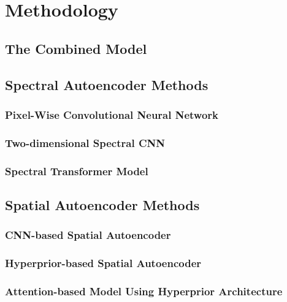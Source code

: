 \chapter{Methodology\label{cha:chapter4}}

\section{The Combined Model}

\section{Spectral Autoencoder Methods}

\subsection{Pixel-Wise Convolutional Neural Network\label{sec:ch3xxx}}

\subsection{Two-dimensional Spectral CNN\label{sec:ch3yyy}}

\subsection{Spectral Transformer Model}

\section{Spatial Autoencoder Methods\label{sec:ch3zzz}}

\subsection{CNN-based Spatial Autoencoder}

\subsection{Hyperprior-based Spatial Autoencoder}

\subsection{Attention-based Model Using Hyperprior Architecture}

